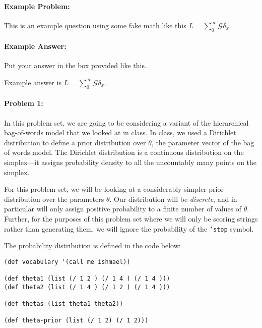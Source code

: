 \documentclass[10pt]{article}
\begin{document}
\noindent\hrulefill %

\paragraph{Example Problem:}
This is an example question using some fake math like this
$L=\sum_0^{\infty} \mathcal{G} \delta_x$.

\paragraph{Example Answer:} 
\begin{mdframed}

Put your answer in the box provided like this.

Example answer is $L=\sum_0^{\infty} \mathcal{G} \delta_x$.

\end{mdframed}


\noindent\hrulefill%

\pagebreak%

\paragraph{Problem 1:}
In this problem set, we are going to be considering a variant of the
hierarchical bag-of-words model that we looked at in class. In class,
we used a Dirichlet distribution to define a prior distribution over
$\theta$, the parameter vector of the bag of words model. The
Dirichlet distribution is a continuous distribution on the
simplex---it assigns probability density to all the uncountably many
points on the simplex.

For this problem set, we will be looking at a considerably simpler
prior distribution over the parameters $\theta$. Our distribution will
be \emph{discrete}, and in particular will only assign positive
probability to a finite number of values of $\theta$. Further, for the
purposes of this problem set where we will only be scoring strings
rather than generating them, we will ignore the probability of the
\texttt{'stop} symbol.

The probability distribution is defined in the code below:

\begin{lstlisting}
(def vocabulary '(call me ishmael))

(def theta1 (list (/ 1 2 ) (/ 1 4 ) (/ 1 4 )))
(def theta2 (list (/ 1 4 ) (/ 1 2 ) (/ 1 4 )))

(def thetas (list theta1 theta2))

(def theta-prior (list (/ 1 2) (/ 1 2)))
\end{lstlisting}
\end{document}
